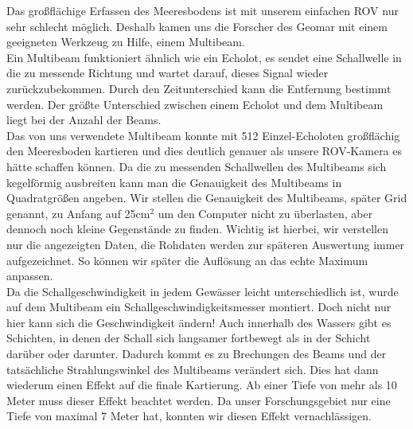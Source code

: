  

Das großflächige Erfassen des Meeresbodens ist mit unserem einfachen ROV nur sehr schlecht möglich. Deshalb kamen uns die Forscher des Geomar mit einem geeigneten Werkzeug zu Hilfe, einem \glqq Multibeam\grqq . \\

Ein Multibeam funktioniert ähnlich wie ein Echolot, es sendet eine Schallwelle in die zu messende 
Richtung und wartet darauf, dieses Signal wieder zurückzubekommen. Durch den Zeitunterschied 
kann die Entfernung bestimmt werden. Der größte Unterschied zwischen einem Echolot und dem Multibeam 
liegt bei der Anzahl der Beams. \\

Das von uns verwendete Multibeam konnte mit 512 Einzel-Echoloten großflächig den Meeresboden kartieren und dies 
deutlich genauer als unsere ROV-Kamera es hätte schaffen können. Da die zu messenden Schallwellen des Multibeams 
sich kegelförmig ausbreiten kann man die Genauigkeit des Multibeams in Quadratgrößen angeben. 
Wir stellen die Genauigkeit des Multibeams, später Grid genannt, zu Anfang auf 25cm$^2$ um den Computer nicht zu überlasten, aber 
dennoch noch kleine Gegenstände zu finden. Wichtig ist hierbei, wir verstellen nur die angezeigten Daten, die Rohdaten werden zur späteren Auswertung immer aufgezeichnet. 
So können wir später die Auflösung an das echte Maximum anpassen.\\

Da die Schallgeschwindigkeit in jedem Gewässer leicht unterschiedlich ist, wurde auf dem Multibeam
ein Schallgeschwindigkeitsmesser montiert. Doch nicht nur hier kann sich die Geschwindigkeit ändern!
Auch innerhalb des Wassers gibt es Schichten, in denen der Schall sich langsamer fortbewegt als in
der Schicht darüber oder darunter. Dadurch kommt es zu Brechungen des Beams und der tatsächliche 
Strahlungswinkel des Multibeams verändert sich. Dies hat dann wiederum einen Effekt auf die finale Kartierung.
Ab einer Tiefe von mehr als 10 Meter muss dieser Effekt beachtet werden. Da unser Forschungsgebiet nur eine 
Tiefe von maximal 7 Meter hat, konnten wir diesen Effekt vernachlässigen.\\

